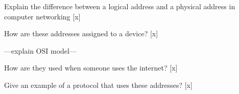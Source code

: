 \documentclass[10pt, aspectratio=43]{beamer}
\begin{document}
Explain the difference between a logical address and a physical address in computer networking [x]



How are these addresses assigned to a device? [x]


---explain OSI model---



How are they used when someone uses the internet? [x]


Give an example of a protocol that uses these addresses? [x]













\fi
\end{document}
